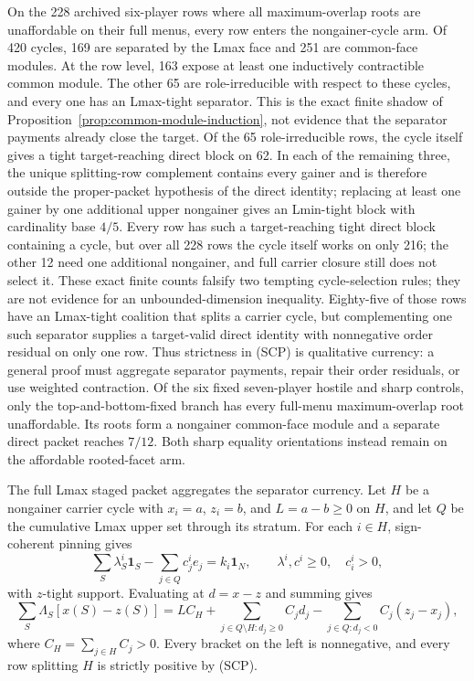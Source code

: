 \documentclass[11pt]{article}
\begin{document}
On the 228 archived six-player rows where all maximum-overlap roots are
unaffordable on their full menus, every row enters the nongainer-cycle arm.
Of 420 cycles, 169 are separated by the Lmax face and 251 are common-face
modules.  At the row level, 163 expose at least one inductively contractible
common module.  The other 65 are role-irreducible with respect to these
cycles, and every one has an Lmax-tight separator.  This is the exact finite
shadow of Proposition~\ref{prop:common-module-induction}, not evidence that
the separator payments already close the target.  Of the 65 role-irreducible
rows, the cycle itself gives a tight target-reaching direct block on 62.
In each of the remaining three, the unique splitting-row complement contains
every gainer and is therefore outside the proper-packet hypothesis of the
direct identity; replacing at least one gainer by one additional upper
nongainer gives an Lmin-tight block with cardinality base $4/5$.  Every row
has such a target-reaching tight direct block containing a cycle, but over
all 228 rows the cycle itself works on only 216; the other 12 need one
additional nongainer, and full carrier closure still does not select it.
These exact finite counts falsify two tempting cycle-selection rules; they
are not evidence for an unbounded-dimension inequality.
Eighty-five of those rows have an Lmax-tight coalition that splits a carrier
cycle, but complementing one such separator supplies a target-valid direct
identity with nonnegative order residual on only one row.  Thus strictness in
(SCP) is qualitative currency: a general proof must aggregate separator
payments, repair their order residuals, or use weighted contraction.
Of the six fixed seven-player hostile and sharp controls, only the
top-and-bottom-fixed branch has every full-menu maximum-overlap root
unaffordable.  Its roots form a nongainer common-face module and a separate
direct packet reaches $7/12$.  Both sharp equality orientations instead
remain on the affordable rooted-facet arm.

The full Lmax staged packet aggregates the separator currency.  Let $H$ be a
nongainer carrier cycle with $x_i=a$, $z_i=b$, and $L=a-b\ge0$ on $H$, and
let $Q$ be the cumulative Lmax upper set through its stratum.  For each
$i\in H$, sign-coherent pinning gives
\[
 \sum_S\lambda^i_S\mathbf1_S-\sum_{j\in Q}c^i_je_j
   =k_i\mathbf1_N,\qquad \lambda^i,c^i\ge0,\quad c^i_i>0, \tag{ASB1}
\]
with $z$-tight support.  Evaluating at $d=x-z$ and summing gives
\[
 \sum_S\Lambda_S[x(S)-z(S)]
 =LC_H+\sum_{j\in Q\setminus H:d_j\ge0}C_jd_j
   -\sum_{j\in Q:d_j<0}C_j(z_j-x_j),                 \tag{ASB2}
\]
where $C_H=\sum_{j\in H}C_j>0$.  Every bracket on the left is nonnegative,
and every row splitting $H$ is strictly positive by (SCP).
\end{document}
